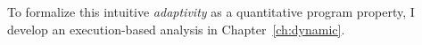 \begin{enumerate}
To formalize this intuitive \emph{adaptivity} as a quantitative program property, 
I develop an execution-based analysis in Chapter~\ref{ch:dynamic}.

\end{enumerate}
